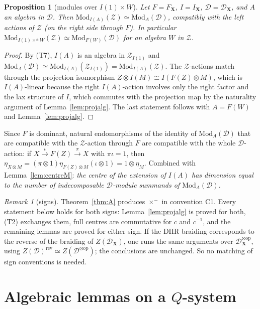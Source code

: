 \documentclass[11pt]{article}
\newtheorem{proposition}[theorem]{Proposition}
\theoremstyle{definition}
\theoremstyle{remark}
\newtheorem{remark}[theorem]{Remark}
\begin{document}
\begin{proposition}[modules over $I(1)\times W$]\label{prop:Q4}
Let $F=F_{\mathbf X}$, $I=I_{\mathbf X}$, $\mathcal D=\mathcal D_{\mathbf X}$, and $A$ an algebra in $\mathcal D$. Then $\mathrm{Mod}_{I(A)}(\mathcal Z)\simeq\mathrm{Mod}_A(\mathcal D)$, compatibly with the left actions of $\mathcal Z$ (on the right side through $F$). In particular $\mathrm{Mod}_{I(1)\times^\pm W}(\mathcal Z)\simeq\mathrm{Mod}_{F(W)}(\mathcal D)$ for an algebra $W$ in $\mathcal Z$.
\end{proposition}
\begin{proof}
By (T7), $I(A)$ is an algebra in $\mathcal Z_{I(1)}$ and $\mathrm{Mod}_A(\mathcal D)\simeq\mathrm{Mod}_{I(A)}(\mathcal Z_{I(1)})=\mathrm{Mod}_{I(A)}(\mathcal Z)$. The $\mathcal Z$-actions match through the projection isomorphism $Z\otimes I(M)\cong I(F(Z)\otimes M)$, which is $I(A)$-linear because the right $I(A)$-action involves only the right factor and the lax structure of $I$, which commutes with the projection map by the naturality argument of Lemma~\ref{lem:projalg}. The last statement follows with $A=F(W)$ and Lemma~\ref{lem:projalg}.
\end{proof}
Since $F$ is dominant, natural endomorphisms of the identity of $\mathrm{Mod}_A(\mathcal D)$ that are compatible with the $\mathcal Z$-action through $F$ are compatible with the whole $\mathcal D$-action: if $X\overset\iota\to F(Z)\overset\pi\to X$ with $\pi\iota=1$, then $\eta_{X\otimes M}=(\pi\otimes1)\eta_{F(Z)\otimes M}(\iota\otimes1)=1\otimes\eta_M$. Combined with Lemma~\ref{lem:centreM}: \emph{the centre of the extension of $I(A)$ has dimension equal to the number of indecomposable $\mathcal D$-module summands of $\mathrm{Mod}_A(\mathcal D)$.}

\begin{remark}[signs]\label{rem:signs}
Theorem~\ref{thm:A} produces $\times^-$ in convention C1. Every statement below holds for both signs: Lemma~\ref{lem:projalg} is proved for both, (T2) exchanges them, full centres are commutative for $c$ and $c^{-1}$, and the remaining lemmas are proved for either sign. If the DHR braiding corresponds to the reverse of the braiding of $Z(\mathcal D_{\mathbf X})$, one runs the same arguments over $\mathcal D_{\mathbf X}^{\otimes\mathrm{op}}$, using $Z(\mathcal D)^{\mathrm{rev}}\simeq Z(\mathcal D^{\otimes\mathrm{op}})$; the conclusions are unchanged. So no matching of sign conventions is needed.
\end{remark}

\section{Algebraic lemmas on a $Q$-system}\label{sec:alg}
\end{document}
